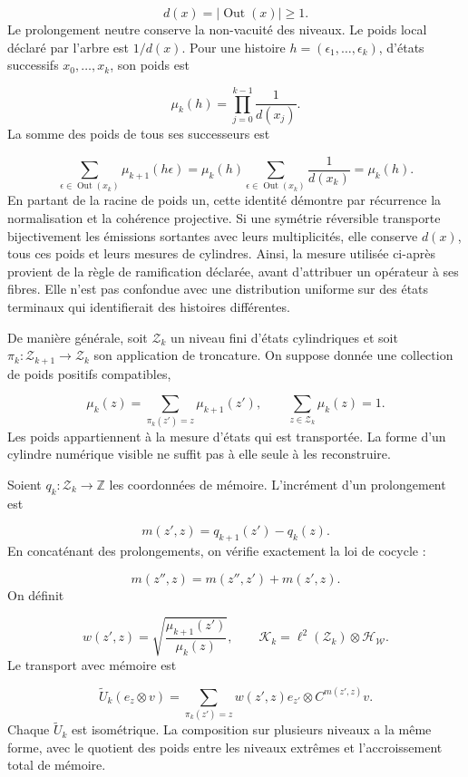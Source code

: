 \[
d(x)=|\operatorname{Out}(x)|\geq1.
\]
Le prolongement neutre conserve la non-vacuité des niveaux. Le poids local déclaré par l'arbre est \(1/d(x)\). Pour une histoire \(h=(\epsilon_1,\ldots,\epsilon_k)\), d'états successifs \(x_0,\ldots,x_k\), son poids est

\[
\mu_k(h)=\prod_{j=0}^{k-1}\frac1{d(x_j)}.
\]
La somme des poids de tous ses successeurs est

\[
\sum_{\epsilon\in\operatorname{Out}(x_k)}
\mu_{k+1}(h\epsilon)
=\mu_k(h)\sum_{\epsilon\in\operatorname{Out}(x_k)}\frac1{d(x_k)}
=\mu_k(h).
\]
En partant de la racine de poids un, cette identité démontre par récurrence la normalisation et la cohérence projective. Si une symétrie réversible transporte bijectivement les émissions sortantes avec leurs multiplicités, elle conserve \(d(x)\), tous ces poids et leurs mesures de cylindres. Ainsi, la mesure utilisée ci-après provient de la règle de ramification déclarée, avant d'attribuer un opérateur à ses fibres. Elle n'est pas confondue avec une distribution uniforme sur des états terminaux qui identifierait des histoires différentes.

De manière générale, soit \(\mathcal Z_k\) un niveau fini d'états cylindriques et soit \(\pi_k:\mathcal Z_{k+1}\to\mathcal Z_k\) son application de troncature. On suppose donnée une collection de poids positifs compatibles,

\[
\mu_k(z)=\sum_{\pi_k(z')=z}\mu_{k+1}(z'),
\qquad \sum_{z\in\mathcal Z_k}\mu_k(z)=1.
\]
Les poids appartiennent à la mesure d’états qui est transportée. La forme d’un cylindre numérique visible ne suffit pas à elle seule à les reconstruire.

Soient \(q_k:\mathcal Z_k\to\mathbb Z\) les coordonnées de mémoire. L'incrément d'un prolongement est

\[
m(z',z)=q_{k+1}(z')-q_k(z).
\]
En concaténant des prolongements, on vérifie exactement la loi de cocycle :

\[
m(z'',z)=m(z'',z')+m(z',z).
\]
On définit

\[
w(z',z)=
\sqrt{\frac{\mu_{k+1}(z')}{\mu_k(z)}},
\qquad
\mathcal K_k=\ell^2(\mathcal Z_k)\otimes\mathcal H_{\mathscr W}.
\]
Le transport avec mémoire est

\[
\widetilde U_k(e_z\otimes v)
=\sum_{\pi_k(z')=z}w(z',z)e_{z'}\otimes C^{m(z',z)}v.
\]
Chaque \(\widetilde U_k\) est isométrique. La composition sur plusieurs niveaux a la même forme, avec le quotient des poids entre les niveaux extrêmes et l’accroissement total de mémoire.

